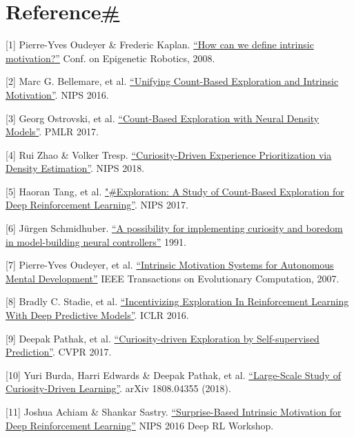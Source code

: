 \section{\texorpdfstring{Reference\hyperref[reference]{\#}}{Reference\#}}\label{reference}

{[}1{]} Pierre-Yves Oudeyer \& Frederic Kaplan. \href{http://citeseerx.ist.psu.edu/viewdoc/download?doi=10.1.1.567.6524&rep=rep1&type=pdf}{``How can we define intrinsic motivation?''} Conf. on Epigenetic Robotics, 2008.

{[}2{]} Marc G. Bellemare, et al. \href{https://arxiv.org/abs/1606.01868}{``Unifying Count-Based Exploration and Intrinsic Motivation''}. NIPS 2016.

{[}3{]} Georg Ostrovski, et al. \href{https://arxiv.org/abs/1703.01310}{``Count-Based Exploration with Neural Density Models''}. PMLR 2017.

{[}4{]} Rui Zhao \& Volker Tresp. \href{https://arxiv.org/abs/1902.08039}{``Curiosity-Driven Experience Prioritization via Density Estimation''}. NIPS 2018.

{[}5{]} Haoran Tang, et al. \href{https://arxiv.org/abs/1611.04717}{"\#Exploration: A Study of Count-Based Exploration for Deep Reinforcement Learning''}. NIPS 2017.

{[}6{]} Jürgen Schmidhuber. \href{http://citeseerx.ist.psu.edu/viewdoc/summary?doi=10.1.1.45.957}{``A possibility for implementing curiosity and boredom in model-building neural controllers''} 1991.

{[}7{]} Pierre-Yves Oudeyer, et al. \href{http://citeseerx.ist.psu.edu/viewdoc/download?doi=10.1.1.177.7661&rep=rep1&type=pdf}{``Intrinsic Motivation Systems for Autonomous Mental Development''} IEEE Transactions on Evolutionary Computation, 2007.

{[}8{]} Bradly C. Stadie, et al. \href{https://arxiv.org/abs/1507.00814}{``Incentivizing Exploration In Reinforcement Learning With Deep Predictive Models''}. ICLR 2016.

{[}9{]} Deepak Pathak, et al. \href{https://arxiv.org/abs/1705.05363}{``Curiosity-driven Exploration by Self-supervised Prediction''}. CVPR 2017.

{[}10{]} Yuri Burda, Harri Edwards \& Deepak Pathak, et al. \href{https://arxiv.org/abs/1808.04355}{``Large-Scale Study of Curiosity-Driven Learning''}. arXiv 1808.04355 (2018).

{[}11{]} Joshua Achiam \& Shankar Sastry. \href{https://arxiv.org/abs/1703.01732}{``Surprise-Based Intrinsic Motivation for Deep Reinforcement Learning''} NIPS 2016 Deep RL Workshop.

